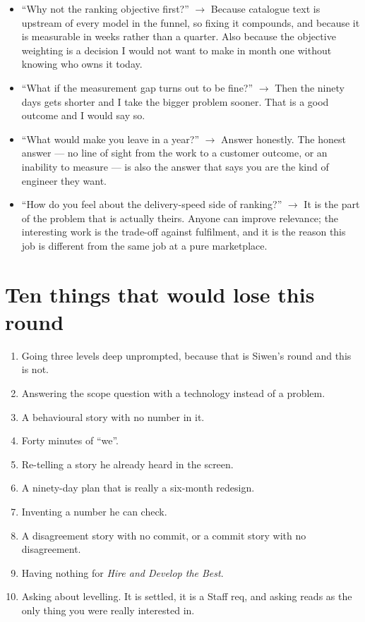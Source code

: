 \documentclass[10pt,twoside]{book}
\newcommand{\cchapter}[1]{\chapter{#1}}
\begin{document}
\begin{itemize}
\item ``Why not the ranking objective first?'' $\to$ Because catalogue text is upstream of every model in the funnel, so fixing it compounds, and because it is measurable in weeks rather than a quarter. Also because the objective weighting is a decision I would not want to make in month one without knowing who owns it today.
\item ``What if the measurement gap turns out to be fine?'' $\to$ Then the ninety days gets shorter and I take the bigger problem sooner. That is a good outcome and I would say so.
\item ``What would make you leave in a year?'' $\to$ Answer honestly. The honest answer --- no line of sight from the work to a customer outcome, or an inability to measure --- is also the answer that says you are the kind of engineer they want.
\item ``How do you feel about the delivery-speed side of ranking?'' $\to$ It is the part of the problem that is actually theirs. Anyone can improve relevance; the interesting work is the trade-off against fulfilment, and it is the reason this job is different from the same job at a pure marketplace.
\end{itemize}
\cchapter{Ten things that would lose this round}
\begin{enumerate}
\item Going three levels deep unprompted, because that is Siwen's round and this is not.
\item Answering the scope question with a technology instead of a problem.
\item A behavioural story with no number in it.
\item Forty minutes of ``we''.
\item Re-telling a story he already heard in the screen.
\item A ninety-day plan that is really a six-month redesign.
\item Inventing a number he can check.
\item A disagreement story with no commit, or a commit story with no disagreement.
\item Having nothing for \textit{Hire and Develop the Best}.
\item Asking about levelling. It is settled, it is a Staff req, and asking reads as the only thing you were really interested in.
\end{enumerate}
\end{document}
